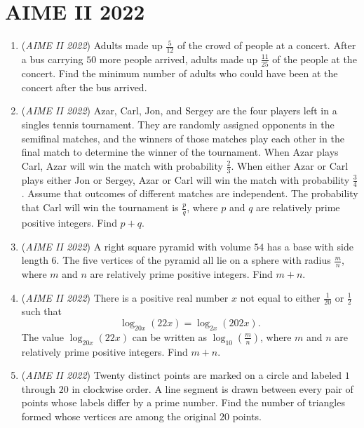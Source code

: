 \section{AIME II 2022}
        \begin{enumerate}
        	\item (\textit{AIME II 2022}) Adults made up $\frac5{12}$ of the crowd of people at a concert. After a bus carrying $50$ more people arrived, adults made up $\frac{11}{25}$ of the people at the concert. Find the minimum number of adults who could have been at the concert after the bus arrived.


 

	\item (\textit{AIME II 2022}) Azar, Carl, Jon, and Sergey are the four players left in a singles tennis tournament. They are randomly assigned opponents in the semifinal matches, and the winners of those matches play each other in the final match to determine the winner of the tournament. When Azar plays Carl, Azar will win the match with probability $\frac23$. When either Azar or Carl plays either Jon or Sergey, Azar or Carl will win the match with probability $\frac34$. Assume that outcomes of different matches are independent. The probability that Carl will win the tournament is $\frac{p}{q}$, where $p$ and $q$ are relatively prime positive integers. Find $p+q$.


 

	\item (\textit{AIME II 2022}) A right square pyramid with volume $54$ has a base with side length $6.$ The five vertices of the pyramid all lie on a sphere with radius $\frac mn$, where $m$ and $n$ are relatively prime positive integers. Find $m+n$.


 

	\item (\textit{AIME II 2022}) There is a positive real number $x$ not equal to either $\frac{1}{20}$ or $\frac{1}{2}$ such that
 \[\log_{20x} (22x)=\log_{2x} (202x).\]The value $\log_{20x} (22x)$ can be written as $\log_{10} (\frac{m}{n})$, where $m$ and $n$ are relatively prime positive integers. Find $m+n$.


 

	\item (\textit{AIME II 2022}) Twenty distinct points are marked on a circle and labeled $1$ through $20$ in clockwise order. A line segment is drawn between every pair of points whose labels differ by a prime number. Find the number of triangles formed whose vertices are among the original $20$ points.



\end{enumerate}
